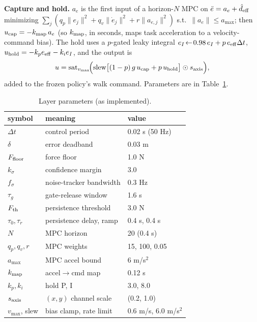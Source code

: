 \documentclass[journal]{IEEEtran}
\begin{document}
\textbf{Capture and hold.} $a_e$ is the first input of a horizon-$N$ MPC on $\ddot e=a_e+\hat d_{\rm eff}$ minimizing $\sum_j(q_p\|e_j\|^2+q_v\|\dot e_j\|^2+r\|a_{e,j}\|^2)$ s.t.\ $\|a_e\|\le a_{\max}$; then $u_{\rm cap}=-k_{\rm map}\,a_e$ (so $k_{\rm map}$, in seconds, maps task acceleration to a velocity-command bias). The hold uses a $p$-gated leaky integral $e_I\!\leftarrow\!0.98\,e_I+p\,e_{\rm eff}\Delta t$, $u_{\rm hold}=-k_p e_{\rm eff}-k_i e_I$, and the output is
\begin{equation}
u=\mathrm{sat}_{v_{\max}}\!\Big(\mathrm{slew}\big[(1-p)\,g\,u_{\rm cap}+p\,u_{\rm hold}\big]\odot s_{\rm axis}\Big),
\label{eq:out}
\end{equation}
added to the frozen policy's walk command. Parameters are in Table~\ref{tab:params}.

\begin{table}[t]
\caption{Layer parameters (as implemented).}
\label{tab:params}
\centering
\small
\setlength{\tabcolsep}{4pt}
\begin{tabular}{lll}
\hline
symbol & meaning & value\\
\hline
$\Delta t$ & control period & 0.02 s (50 Hz)\\
$\delta$ & error deadband & 0.03 m\\
$F_{\rm floor}$ & force floor & 1.0 N\\
$k_\sigma$ & confidence margin & 3.0\\
$f_\sigma$ & noise-tracker bandwidth & 0.3 Hz\\
$\tau_g$ & gate-release window & 1.6 s\\
$F_{\rm th}$ & persistence threshold & 3.0 N\\
$\tau_0,\tau_r$ & persistence delay, ramp & 0.4 s, 0.4 s\\
$N$ & MPC horizon & 20 (0.4 s)\\
$q_p,q_v,r$ & MPC weights & 15, 100, 0.05\\
$a_{\max}$ & MPC accel bound & 6 m/s$^2$\\
$k_{\rm map}$ & accel$\rightarrow$cmd map & 0.12 s\\
$k_p,k_i$ & hold P, I & 3.0, 8.0\\
$s_{\rm axis}$ & $(x,y)$ channel scale & (0.2, 1.0)\\
$v_{\max}$, slew & bias clamp, rate limit & 0.6 m/s, 6.0 m/s$^2$\\
\hline
\end{tabular}
\end{table}
\end{document}
